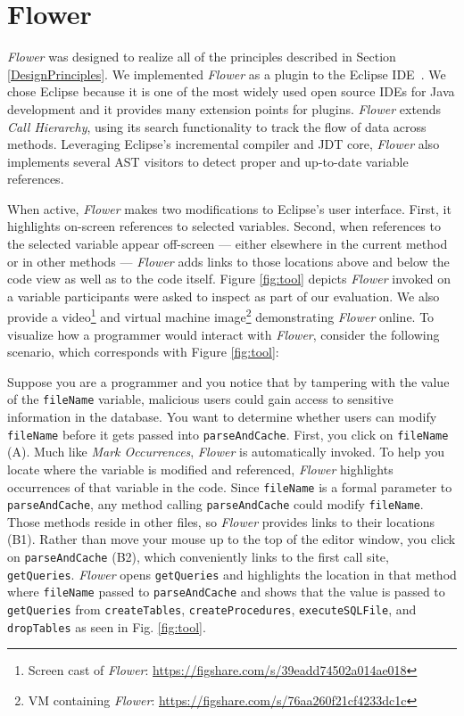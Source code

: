 \documentclass[conference]{IEEEtran}
\begin{document}
\section{Flower}
\textit{Flower} was designed to realize all of the principles described in Section \ref{DesignPrinciples}. 
We implemented \textit{Flower} as a plugin to the Eclipse IDE~\cite{Eclipse}. 
We chose Eclipse because it is one of the most widely used open source IDEs for Java development and it provides many extension points for plugins. 
\textit{Flower} extends \emph{Call Hierarchy}, using its search functionality to track the flow of data across methods. 
Leveraging Eclipse's incremental compiler and JDT core, \textit{Flower} also implements several AST visitors to detect proper and up-to-date variable references.

When active, \textit{Flower} makes two modifications to Eclipse's user interface. 
First, it highlights on-screen references to selected variables.
Second, when references to the selected variable appear off-screen --- either elsewhere in the current method or in other methods --- \textit{Flower} adds links to those locations above and below the code view as well as to the code itself. 
Figure \ref{fig:tool} depicts \textit{Flower} invoked on a variable participants were asked to inspect as part of our evaluation. We also provide a 
video\footnote{Screen cast of \textit{Flower}: \url{https://figshare.com/s/39eadd74502a014ae018}} 
and virtual machine 
image\footnote{VM containing \textit{Flower}: \url{https://figshare.com/s/76aa260f21cf4233dc1c}}
demonstrating \textit{Flower} online.
To visualize how a programmer would interact with \textit{Flower}, consider the following scenario, which corresponds with Figure \ref{fig:tool}:

Suppose you are a programmer and you notice that by tampering with the value of the \texttt{fileName} variable, malicious users could gain access to sensitive information in the database. 
You want to determine whether users can modify \texttt{fileName} before it gets passed into \texttt{parseAndCache}. 
First, you click on \texttt{fileName} (A).
Much like \emph{Mark Occurrences}, \textit{Flower} is automatically invoked.
To help you locate where the variable is modified and referenced, \textit{Flower} highlights occurrences of that variable in the code.
Since \texttt{fileName} is a formal parameter to \texttt{parseAndCache}, any method calling \texttt{parseAndCache} could modify \texttt{fileName}. 
Those methods reside in other files, so \textit{Flower} provides links to their locations (B1).
Rather than move your mouse up to the top of the editor window, you click on \texttt{parseAndCache} (B2), which conveniently links to the first call site, \texttt{getQueries}. 
\textit{Flower} opens \texttt{getQueries} and highlights the location in that method where \texttt{fileName} passed to \texttt{parseAndCache} and shows that the value is passed to \texttt{getQueries} from \texttt{createTables}, \texttt{createProcedures}, \texttt{executeSQLFile}, and \texttt{dropTables} as seen in Fig. \ref{fig:tool}.  
\end{document}
